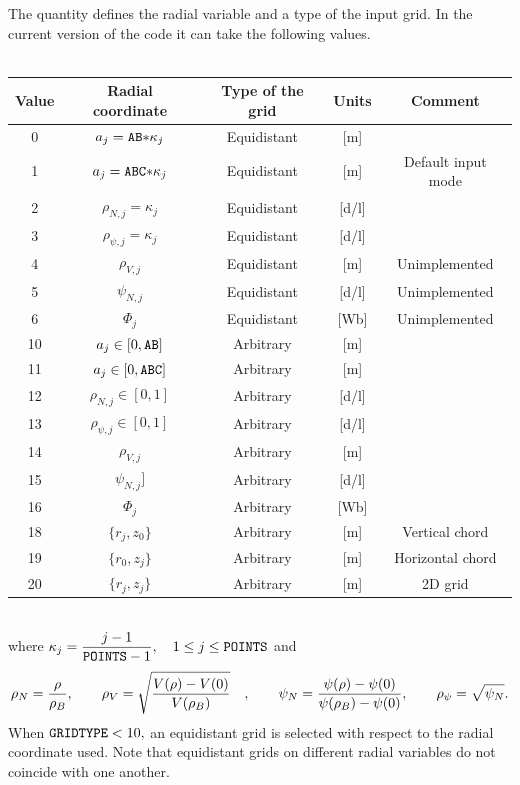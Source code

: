 The quantity  defines the radial variable and a type of 
the input grid.
In the current version of the code it can take the following values.
\smallskip\\
\nopagebreak\\[10pt]\nopagebreak\indent
\begin{tabular}{|c|c|c|c|c|}
\hline
Value 	&  Radial coordinate & Type of the grid	& Units & Comment\\
\hline
0	& $a_j={\tt AB*}\kappa_j$	& Equidistant & [m] & \\
1	& $a_j={\tt ABC*}\kappa_j$	& Equidistant & [m] 
					& Default input mode \\
2	& $\rho_{N,j}=\kappa_j$	& Equidistant & [d/l] &	\\
3	& $\rho_{\psi,j}=\kappa_j$	& Equidistant & [d/l] & \\
4	& $\rho_{V,j}$		& Equidistant & [m] & Unimplemented \\
5	& $\psi_{N,j}$		& Equidistant & [d/l] & Unimplemented \\
6	& $\Phi_{j}$		& Equidistant & [Wb]  & Unimplemented \\
10	& $a_j\in[0,{\tt AB}]$	& Arbitrary   & [m] &	 \\
11	& $a_j\in[0,{\tt ABC}]$	& Arbitrary   & [m] &	 \\
12	& $\rho_{N,j}\in[0,1]$	& Arbitrary   & [d/l] &	 \\
13	& $\rho_{\psi,j}\in[0,1]$& Arbitrary   & [d/l] & \\
14	& $\rho_{V,j}$		& Arbitrary   & [m] & 	 \\
15	& $\psi_{N,j}]$		& Arbitrary   & [d/l]& 	 \\
16	& $\Phi_{j}$		& Arbitrary   & [Wb]& 	 \\
18	& $\{r_j,z_0\}$		& Arbitrary 	& [m] & Vertical   chord \\
19	& $\{r_0,z_j\}$		& Arbitrary 	& [m] & Horizontal chord \\
20	& $\{r_j,z_j\}$		& Arbitrary 	& [m] & 2D grid \\
\hline
\end{tabular}
\\[15pt]
where $\kappa_j=\displaystyle\frac{j-1}{{\tt POINTS}-1},\quad 1\leq j\leq{\tt POINTS}$ 
and
$$
\rho_N=\frac{\rho}{\rho_B}
,\qquad
\rho_V=\sqrt\frac{V(\rho)-V(0)}{V(\rho_B)}\quad
,\qquad
\psi_N=\frac{\psi(\rho)-\psi(0)}{\psi(\rho_B)-\psi(0)}
,\qquad
\rho_\psi=\sqrt{\psi_N}
.
$$
When ${\tt GRIDTYPE}< 10,$ an equidistant grid is selected   
with respect to the radial coordinate used.
Note that equidistant grids on different radial variables
do not coincide with one another.

